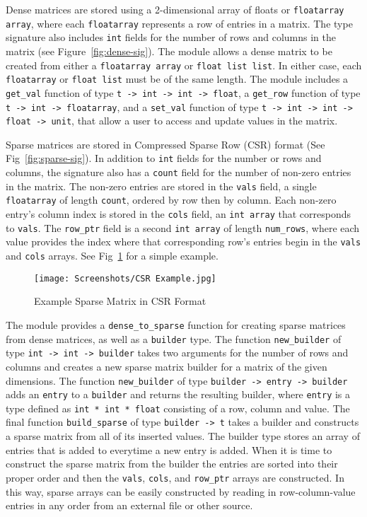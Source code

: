 \documentclass[pageno]{jpaper}
\begin{document}
\begin{doublespacing}
Dense matrices are stored using a 2-dimensional array of floats or \verb|floatarray array|, where each \verb|floatarray| represents a row of entries in a matrix. The type signature also includes \verb|int| fields for the number of rows and columns in the matrix (see Figure~\ref{fig:dense-sig}). The module allows a dense matrix to be created from either a \verb|floatarray array| or \verb|float list list|. In either case, each \verb|floatarray| or \verb|float list| must be of the same length. The module includes a \verb|get_val| function of type \verb|t -> int -> int -> float|, a \verb|get_row| function of type \verb|t -> int -> floatarray|, and a \verb|set_val| function of type \verb|t -> int -> int -> float -> unit|, that allow a user to access and update values in the matrix.

Sparse matrices are stored in Compressed Sparse Row (CSR) format \cite{templates} (See Fig~\ref{fig:sparse-sig}). In addition to \verb|int| fields for the number or rows and columns, the signature also has a \verb|count| field for the number of non-zero entries in the matrix. The non-zero entries are stored in the \verb|vals| field, a single \verb|floatarray| of length \verb|count|, ordered by row then by column. Each non-zero entry's column index is stored in the \verb|cols| field, an \verb|int array| that corresponds to \verb|vals|. The \verb|row_ptr| field is a second \verb|int array| of length \verb|num_rows|, where each value provides the index where that corresponding row's entries begin in the \verb|vals| and \verb|cols| arrays. See Fig~\ref{fig:csr-example} for a simple example.

\begin{figure}[h]
\centering
\texttt{[image: Screenshots/CSR Example.jpg]}
\caption{Example Sparse Matrix in CSR Format}
\label{fig:csr-example}
\end{figure}

The module provides a \verb|dense_to_sparse| function for creating sparse matrices from dense matrices, as well as a \verb|builder| type. The function \verb|new_builder| of type \verb|int -> int -> builder| takes two arguments for the number of rows and columns and creates a new sparse matrix builder for a matrix of the given dimensions. The function \verb|new_builder| of type \verb|builder -> entry -> builder| adds an \verb|entry| to a \verb|builder| and returns the resulting builder, where \verb|entry| is a type defined as \verb|int * int * float| consisting of a row, column and value. The final function \verb|build_sparse| of type \verb|builder -> t| takes a builder and constructs a sparse matrix from all of its inserted values. The builder type stores an array of entries that is added to everytime a new entry is added. When it is time to construct the sparse matrix from the builder the entries are sorted into their proper order and then the \verb|vals|, \verb|cols|, and \verb|row_ptr| arrays are constructed. In this way, sparse arrays can be easily constructed by reading in row-column-value entries in any order from an external file or other source.


\end{doublespacing}
\end{document}

